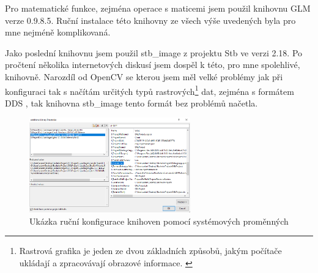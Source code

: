\documentclass[czech,public,dept460,male,cpdeclaration]{diploma}
\begin{document}
Pro matematické funkce, zejména operace s maticemi jsem použil knihovnu GLM \cite{linkToGLM} verze 0.9.8.5. Ruční instalace této knihovny ze všech výše uvedených byla pro mne nejméně komplikovaná.

Jako poslední knihovnu jsem použil stb\_image z projektu Stb \cite{linkToStb} ve verzi 2.18. Po pročtení několika internetových diskusí jsem dospěl k této, pro mne spolehlivé, knihovně. Narozdíl od OpenCV \cite{linkToOpenCV} se kterou jsem měl velké problémy jak při konfiguraci tak s načítám určitých typů rastrových\footnote{Rastrová grafika je jeden ze dvou základních způsobů, jakým počítače ukládají a zpracovávají obrazové informace. \cite{linkToRastr}} dat, zejména s formátem DDS \cite{linkToDDS}, tak knihovna stb\_image tento formát bez problémů načetla.

\begin{figure}[H]\centering\includegraphics[width=0.62\textwidth]{Figures/screen3.png}
	\caption{Ukázka ruční konfigurace knihoven pomocí systémových proměnných}
\end{figure}

\end{document}
